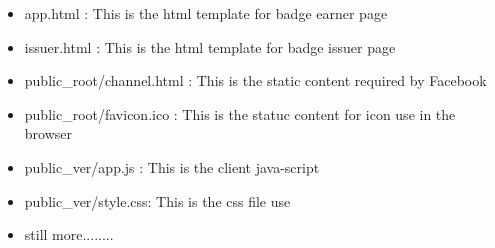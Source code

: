 \begin{itemize}
\item app.html : This is the html template for badge earner page
\item issuer.html : This is the html template for badge issuer page
\item public{\_}root/channel.html : This is the static content required by Facebook 
\item public{\_}root/favicon.ico : This is the statuc content for icon use in the browser
\item public{\_}ver/app.js : This is the client java-script  
\item public{\_}ver/style.css: This is the css file use
\item still more........
\end{itemize}



